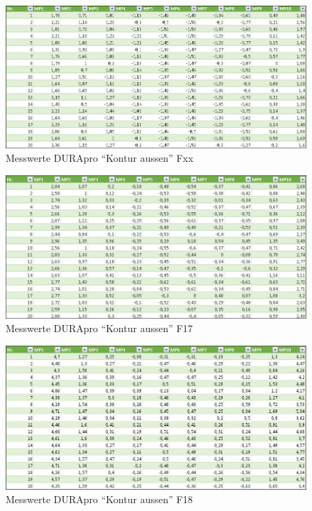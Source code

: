 \documentclass[12pt,a4paper,parskip]{scrartcl}
\begin{document}
\begin{figure}[hbtp]
\centering
\includegraphics[width=1\textwidth]{Fxxdurapro.jpg}
\caption{Messwerte DURApro "`Kontur aussen"' Fxx}
\end{figure}
\begin{figure}[hbtp]
\centering
\includegraphics[width=1\textwidth]{F17durapro.jpg}
\caption{Messwerte DURApro "`Kontur aussen"' F17}
\end{figure}
\begin{figure}[hbtp]
\centering
\includegraphics[width=1\textwidth]{F18durapro.jpg}
\caption{Messwerte DURApro "`Kontur aussen"' F18}
\end{figure}













































   
\end{document}
